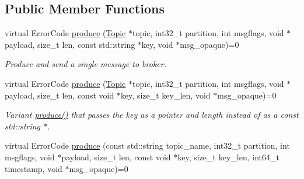 \subsection*{Public Member Functions}
\begin{DoxyCompactItemize}
\item 
virtual ErrorCode \hyperlink{classRdKafka_1_1Producer_ab90a30c5e5fb006a3b4004dc4c9a7923}{produce} (\hyperlink{classRdKafka_1_1Topic}{Topic} $\ast$topic, int32\_\-t partition, int msgflags, void $\ast$payload, size\_\-t len, const std::string $\ast$key, void $\ast$msg\_\-opaque)=0
\begin{DoxyCompactList}\small\item\em Produce and send a single message to broker. \item\end{DoxyCompactList}\item 
\hypertarget{classRdKafka_1_1Producer_a7871c00eb302209acb9ea498eda7dee4}{
virtual ErrorCode \hyperlink{classRdKafka_1_1Producer_a7871c00eb302209acb9ea498eda7dee4}{produce} (\hyperlink{classRdKafka_1_1Topic}{Topic} $\ast$topic, int32\_\-t partition, int msgflags, void $\ast$payload, size\_\-t len, const void $\ast$key, size\_\-t key\_\-len, void $\ast$msg\_\-opaque)=0}
\label{classRdKafka_1_1Producer_a7871c00eb302209acb9ea498eda7dee4}

\begin{DoxyCompactList}\small\item\em Variant \hyperlink{classRdKafka_1_1Producer_ab90a30c5e5fb006a3b4004dc4c9a7923}{produce()} that passes the key as a pointer and length instead of as a const std::string $\ast$. \item\end{DoxyCompactList}\item 
\hypertarget{classRdKafka_1_1Producer_a5d569225be5e98a016f889d54adf4e6c}{
virtual ErrorCode \hyperlink{classRdKafka_1_1Producer_a5d569225be5e98a016f889d54adf4e6c}{produce} (const std::string topic\_\-name, int32\_\-t partition, int msgflags, void $\ast$payload, size\_\-t len, const void $\ast$key, size\_\-t key\_\-len, int64\_\-t timestamp, void $\ast$msg\_\-opaque)=0}
\label{classRdKafka_1_1Producer_a5d569225be5e98a016f889d54adf4e6c}


\end{DoxyCompactItemize}
